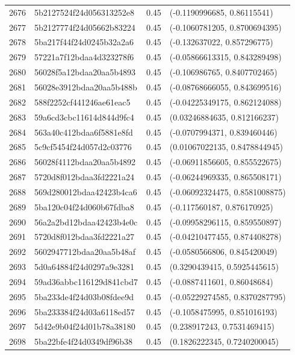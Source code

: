 \begin{table}[ht]
\begin{tabular}{rlrl}
  2676 & 5b2127524f24d056313252e8 & 0.45 & (-0.1190996685, 0.86115541) \\ 
  2677 & 5b2127774f24d05662b83224 & 0.45 & (-0.1060781205, 0.8700694395) \\ 
  2678 & 5ba217f44f24d0245b32a2a6 & 0.45 & (-0.132637022, 0.857296775) \\ 
  2679 & 57221a7f12bdaa4d323278f6 & 0.45 & (-0.05866613315, 0.843289498) \\ 
  2680 & 56028f5a12bdaa20aa5b4893 & 0.45 & (-0.106986765, 0.8407702465) \\ 
  2681 & 56028e3912bdaa20aa5b488b & 0.45 & (-0.08768666055, 0.843699516) \\ 
  2682 & 588f2252cf441246ae61eac5 & 0.45 & (-0.04225349175, 0.862124088) \\ 
  2683 & 59a6cd3cbc11614d844d9fc4 & 0.45 & (0.03246884635, 0.812166237) \\ 
  2684 & 563a40c412bdaa6f5881e8fd & 0.45 & (-0.0707994371, 0.839460446) \\ 
  2685 & 5c9cf5454f24d057d2c03776 & 0.45 & (0.01067022135, 0.8478844945) \\ 
  2686 & 56028f4112bdaa20aa5b4892 & 0.45 & (-0.06911856605, 0.855522675) \\ 
  2687 & 5720d8f012bdaa3fd2221a24 & 0.45 & (-0.06244969335, 0.865508171) \\ 
  2688 & 569d280012bdaa42423b4ca6 & 0.45 & (-0.06092324475, 0.8581008875) \\ 
  2689 & 5ba120c04f24d060b67fdba8 & 0.45 & (-0.117560187, 0.876170925) \\ 
  2690 & 56a2a2bd12bdaa42423b4e0c & 0.45 & (-0.09958296115, 0.859550897) \\ 
  2691 & 5720d8f012bdaa3fd2221a27 & 0.45 & (-0.04210477455, 0.874408278) \\ 
  2692 & 5602947712bdaa20aa5b48af & 0.45 & (-0.0580566806, 0.845420049) \\ 
  2693 & 5d0a64884f24d0297a9e3281 & 0.45 & (0.3290439415, 0.5925445615) \\ 
  2694 & 59ad36abbc116129d841cbd7 & 0.45 & (-0.0887411601, 0.86048684) \\ 
  2695 & 5ba233de4f24d03b08fdee9d & 0.45 & (-0.05229274585, 0.8370287795) \\ 
  2696 & 5ba233384f24d03a6118ed57 & 0.45 & (-0.1058475995, 0.851016193) \\ 
  2697 & 5d42e9b04f24d01b78a38180 & 0.45 & (0.238917243, 0.7531469415) \\ 
  2698 & 5ba22bfe4f24d0349df96b38 & 0.45 & (0.1826222345, 0.7240200045) \\ 

\end{tabular}
\end{table}
